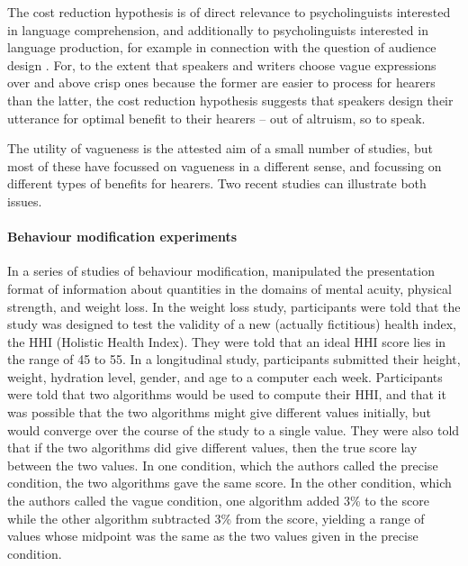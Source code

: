 \documentclass[graybox,envcountchap,sectrefs%
,footinfo
]{svmono}
\begin{document}
The cost reduction hypothesis is of direct relevance to psycholinguists interested in language comprehension, and additionally to psycholinguists interested in language production, for example in connection with the question of audience design \citep{Clark1982287}. For, to the extent that speakers and writers choose vague expressions over and above crisp ones because the former are easier to process for hearers than the latter, the cost reduction hypothesis suggests that speakers design their utterance for optimal benefit to their hearers -- out of altruism, so to speak.

The utility of vagueness is the attested aim of a small number of studies, but most of these have focussed on vagueness in a different sense, and focussing on different types of benefits for hearers. Two recent studies can illustrate both issues. 

\paragraph{Behaviour modification experiments} 
In a series of studies of behaviour modification, \citet[]{Mishra01042011} manipulated the presentation format of information about quantities in the domains of mental acuity, physical strength, and weight loss. In the weight loss study, participants were told that the study was designed to test the validity of a new (actually fictitious) health index, the HHI (Holistic Health Index). They were told that an ideal HHI score lies in the range of 45 to 55. In a longitudinal study, participants submitted their height, weight, hydration level, gender, and age to a computer each week. Participants were told that two algorithms would be used to compute their HHI, and that it was possible that the two algorithms might give different values initially, but would converge over the course of the study to a single value. They were also told that if the two algorithms did give different values, then the true score lay between the two values. In one condition, which the authors called the precise condition, the two algorithms gave the same score. In the other condition, which the authors called the vague condition, one algorithm added 3\% to the score while the other algorithm subtracted 3\% from the score, yielding a range of values whose midpoint was the same as the two values given in the precise condition. 
\end{document}
